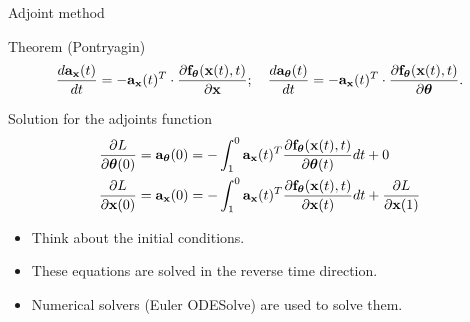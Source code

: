 \begin{frame}{Adjoint method}
	\begin{block}{Theorem (Pontryagin)}
		\vspace{-0.6cm}
		\[
		\frac{d \mathbf{a}_{\mathbf{x}}(t)}{dt} = - \mathbf{a}_{\mathbf{x}}(t)^T \cdot \frac{\partial \mathbf{f}_{\boldsymbol{\theta}}(\mathbf{x}(t), t)}{\partial \mathbf{x}}; \quad \frac{d \mathbf{a}_{\boldsymbol{\theta}}(t)}{dt} = - \mathbf{a}_{\mathbf{x}}(t)^T \cdot \frac{\partial \mathbf{f}_{\boldsymbol{\theta}}(\mathbf{x}(t),  t)}{\partial \boldsymbol{\theta}}.
		\]
		\vspace{-0.7cm}
	\end{block}
	\begin{block}{Solution for the adjoints function}
		\vspace{-0.5cm}
		\begin{align*}
			\frac{\partial L}{\partial \boldsymbol{\theta}(0)} &= \mathbf{a}_{\boldsymbol{\theta}}(0) =  - \int_{1}^{0} \mathbf{a}_{\mathbf{x}}(t)^T \frac{\partial \mathbf{f}_{\boldsymbol{\theta}}(\mathbf{x}(t), t)}{\partial \boldsymbol{\theta}(t)} dt + 0\\
			\frac{\partial L}{\partial \mathbf{x}(0)} &= \mathbf{a}_{\mathbf{x}}(0) =  - \int_{1}^{0} \mathbf{a}_{\mathbf{x}}(t)^T \frac{\partial \mathbf{f}_{\boldsymbol{\theta}}(\mathbf{x}(t), t)}{\partial \mathbf{x}(t)} dt + \frac{\partial L}{\partial \mathbf{x}(1)}
		\end{align*}
	\end{block}
	\begin{itemize}
		\item Think about the initial conditions.
		\item These equations are solved in the reverse time direction.
		\item Numerical solvers (Euler ODESolve) are used to solve them.
	\end{itemize}
\end{frame}

